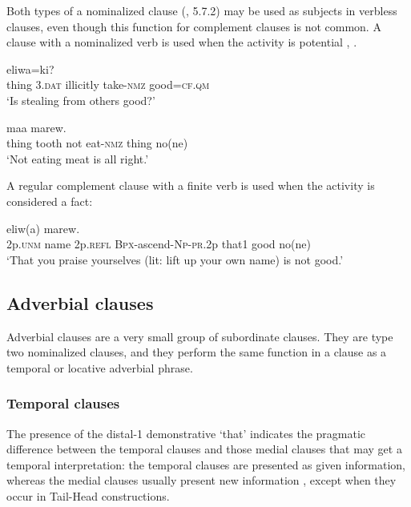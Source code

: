 Both types of a nominalized clause (, 5.7.2) may be used as subjects in verbless clauses, even though this function for complement clauses is not common. A clause with a nominalized verb is used when the activity is potential , . 

\ea%
\label{ex:8:x1636}
  eliwa=ki? \\
thing  3.\textsc{dat} illicitly take-\textsc{nmz} good=\textsc{cf}.\textsc{qm}\\
\glt`Is stealing from others good?'
\z


\ea%
\label{ex:8:x1637}
  maa  marew.\\
thing  tooth  not  eat-\textsc{nmz} thing  no(ne)\\
\glt`Not eating meat is all right.'
\z


A regular complement clause with a finite verb is used when the activity is considered a fact:

\ea%
\label{ex:8:x1639}
  eliw(a) marew.\\
2p.\textsc{unm} name 2p.\textsc{refl} \textsc{Bpx}-ascend-\textsc{Np}-\textsc{pr}.2p that1 good no(ne)\\
\glt`That you praise yourselves (lit: lift up your own name) is not good.'
\z


\subsection{Adverbial clauses} \label{sec:8.3.3}

Adverbial clauses are a very small group of subordinate clauses. They are type two nominalized clauses, and they perform the same function in a clause as a temporal or locative adverbial phrase. 

\subsubsection{Temporal clauses}  \label{sec:8.3.3.1}

The presence of the distal-1 demonstrative  `that' indicates the pragmatic difference between the temporal clauses and those medial clauses that may get a temporal interpretation: the temporal clauses are presented as given information, whereas the medial clauses usually present new information , except when they occur in Tail-Head constructions.

